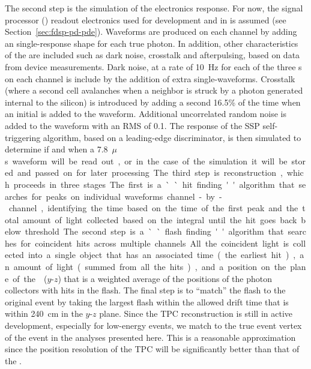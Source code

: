The second step is the simulation of the electronics response. For now, the  signal processor () readout electronics used for  development and in  is assumed (see Section~\ref{sec:fdsp-pd-pde}). 
Waveforms are produced on each channel by adding an  single-\phel response shape for each true photon. In addition, other characteristics of the  are included such as dark noise, crosstalk and afterpulsing, based on data from device measurements. 
Dark noise, at a rate of \SI{10}{Hz} for each of the three s on each channel is include by the addition of extra single-\phel waveforms. Crosstalk (where a second cell avalanches when a neighbor is struck by a photon generated internal to the silicon) is introduced by adding a second \phel \num{16.5}\% of the time when an initial \phel is added to the waveform. Additional uncorrelated random noise is added to the waveform with an RMS of %
\SI{0.1}{\phel}. The response of the SSP self-triggering algorithm, based on a leading-edge discriminator, is then simulated to determine if and when a \SI{7.8}{$\mu$s} waveform will be read out, or in the case of the simulation it will be stored and passed on for later processing.

The third step is reconstruction, which proceeds in three stages. The first is a ``hit finding'' algorithm that searches for peaks on individual waveforms channel-by-channel, identifying the time based on the time of the first peak and the total amount of light collected based on the integral until the hit goes back below threshold. The second step is a ``flash finding'' algorithm that searches for coincident hits across multiple channels. All the coincident light is collected into a single object that has an associated time (the earliest hit), an amount of light (summed from all the hits), and a position on the plane of the  ($y$-$z$) that is a weighted average of the positions of the photon collectors with hits in the flash. %
The final step is to ``match'' the flash to the original event by taking the largest flash within the allowed drift time that is within \SI{240}{cm} in the $y$-$z$ plane. Since the TPC reconstruction is still in active development, especially for low-energy events, we match to the true event %
vertex of the event in the analyses presented here. This is a reasonable approximation since the position resolution of the TPC will be significantly better than that of the . 

